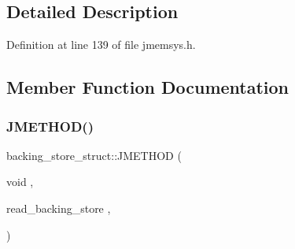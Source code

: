 \subsection{Detailed Description}


Definition at line 139 of file jmemsys.\+h.



\subsection{Member Function Documentation}
\mbox{\label{structbacking__store__struct_a22c5a1f420b61a5c3f48e857d61ceb35}} 
\subsubsection{\texorpdfstring{JMETHOD()}{JMETHOD()}\hspace{0.1cm}{\footnotesize\ttfamily [1/3]}}
{\footnotesize\ttfamily backing\+\_\+store\+\_\+struct\+::\+J\+M\+E\+T\+H\+OD (\begin{DoxyParamCaption}\item[{void}]{,  }\item[{read\+\_\+backing\+\_\+store}]{,  }\item[{(\mbox{\hyperlink{jpeglib_8h_a1a177ab705cefea8f30ec31a48e62650}{j\+\_\+common\+\_\+ptr}} cinfo, \mbox{\hyperlink{jmemsys_8h_a2e08364903e928910fa9b65ea16c19f9}{backing\+\_\+store\+\_\+ptr}} \mbox{\hyperlink{jmemsys_8h_aae47c0f1d689d6cba5eb7077ca1299fa}{info}}, void \mbox{\hyperlink{jmorecfg_8h_aef060b3456fdcc093a7210a762d5f2ed}{F\+AR}} $\ast$buffer\+\_\+address, long file\+\_\+offset, long byte\+\_\+count)}]{ }\end{DoxyParamCaption})}

\mbox{\label{structbacking__store__struct_aa54343491f740a9d799eeb9c3e7e09d2}} 
